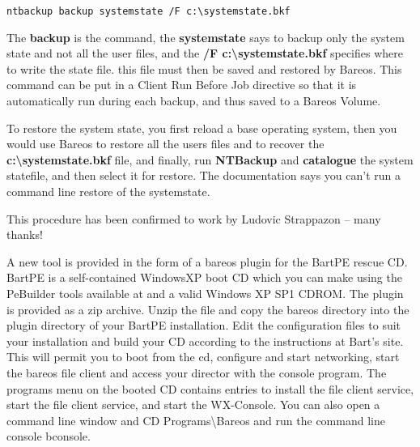 \footnotesize
\begin{verbatim}
ntbackup backup systemstate /F c:\systemstate.bkf
\end{verbatim}
\normalsize

The {\bf backup} is the command, the {\bf systemstate} says to backup only the
system state and not all the user files, and the {\bf /F
c:\textbackslash{}systemstate.bkf} specifies where to write the state file.
this file must then be saved and restored by Bareos. This command
can be put in a Client Run Before Job directive so that it is automatically
run during each backup, and thus saved to a Bareos Volume.

To restore the system state, you first reload a base operating system, then
you would use Bareos to restore all the users files and to recover the {\bf
c:\textbackslash{}systemstate.bkf} file, and finally, run {\bf NTBackup} and
{\bf catalogue} the system statefile, and then select it for restore. The
documentation says you can't run a command line restore of the systemstate.

This procedure has been confirmed to work by Ludovic Strappazon -- many
thanks!

A new tool is provided in the form of a bareos plugin for the BartPE rescue
CD. BartPE is a self-contained WindowsXP boot CD which you can make using the
PeBuilder tools available at
 and a valid
Windows XP SP1 CDROM. The plugin is provided as a zip archive. Unzip the file
and copy the bareos directory into the plugin directory of your BartPE
installation. Edit the configuration files to suit your installation and build
your CD according to the instructions at Bart's site. This will permit you to
boot from the cd, configure and start networking, start the bareos file client
and access your director with the console program. The programs menu on the
booted CD contains entries to install the file client service, start the file
client service, and start the WX-Console. You can also open a command line
window and CD Programs\textbackslash{}Bareos and run the command line console
bconsole.
